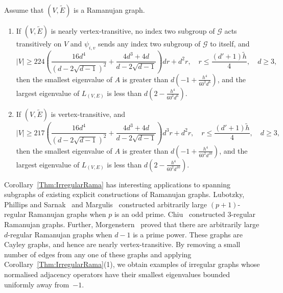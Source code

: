 \documentclass[ALCO,Unicode,published]{cedram}
\newcommand{\calG}{\ensuremath{\mathcal{G}}}
\begin{document}
\begin{corollary}
\label{Thm:IrregularRama}
Assume that $(V, \widetilde E)$ is a Ramanujan graph. 
\begin{enumerate}
\item 
If $(V, \widetilde E)$ is nearly vertex-transitive, no index two subgroup of $\calG$ acts transitively on $V$ and $\psi_{i, v}$ sends any index two subgroup of $\calG$ to itself, and 
$$
|V| 
 \geq 
224
\left( \frac{16 d^4}{(d - 2 \sqrt {d-1})^2} + \frac{4d^3+ 4d}{d - 2 \sqrt {d-1}} \right) dr + d^{2}r
, \quad
r \leq \frac{(d'+1)\widetilde h}4, \quad 
d \geq 3,
$$
then the smallest eigenvalue of $A$ is greater than $ d \left(-1 + \frac{h^4 }{60^2 d^{6}}\right)
$, and the largest eigenvalue of $L_{(V, E)}$ is less than $d \left(2 -  \frac{h^4 }{60^2 d^{6}}\right)
$. 

\item 
If $(V, \widetilde E)$ is vertex-transitive, and  
$$
|V| 
 \geq 
217
\left( \frac{16 d^4}{(d - 2 \sqrt {d-1})^2} + \frac{4d^3 + 4d}{d - 2 \sqrt {d-1}}\right) d^3 r + d^{2}r
, \quad
r \leq \frac{(d'+1)\widetilde h}4, \quad 
d \geq 3,
$$
then the smallest eigenvalue of $A$ is greater than $d \left(-1 + \frac{h^4 }{60^2 d^{10}}\right)
$, and the largest eigenvalue of $L_{(V, E)}$ is less than $d \left(2 -  \frac{h^4 }{60^2 d^{10}}\right)
$. 
\end{enumerate}
\end{corollary}

Corollary~\ref{Thm:IrregularRama} has interesting applications to spanning subgraphs of existing explicit constructions of Ramanujan graphs. Lubotzky, Phillips and Sarnak~\cite{LPS88Ramanujan} and Margulis~\cite{Margulis88ExpandConcent} constructed arbitrarily large $(p+1)$-regular  Ramanujan graphs when $p$ is an odd prime. Chiu~\cite{ChiuCubicRamanujan} constructed $3$-regular Ramanujan graphs. Further, Morgenstern~\cite{MorgensternJCTB94} proved that there are arbitrarily large $d$-regular Ramanujan graphs when $d-1$ is a prime power. These graphs are Cayley graphs, and hence are nearly vertex-transitive. By removing a small number of edges from any one of these graphs and applying Corollary~\ref{Thm:IrregularRama}(1), we obtain examples of irregular graphs whose normalised adjacency operators have their smallest eigenvalues bounded uniformly away from~$-1$. 






\end{document}
